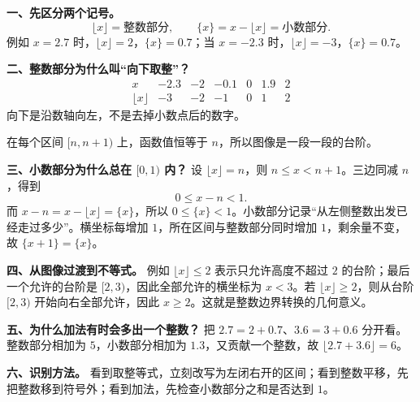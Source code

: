 \begin{explanationbox}
\textbf{一、先区分两个记号。}
\[\lfloor x\rfloor=\text{整数部分},\qquad \{x\}=x-\lfloor x\rfloor=\text{小数部分}.\]
例如 $x=2.7$ 时，$\lfloor x\rfloor=2$，$\{x\}=0.7$；当 $x=-2.3$ 时，$\lfloor x\rfloor=-3$，$\{x\}=0.7$。

\textbf{二、整数部分为什么叫“向下取整”？}
\[\begin{array}{c|rrrrrr}x&-2.3&-2&-0.1&0&1.9&2\\\hline \lfloor x\rfloor&-3&-2&-1&0&1&2\end{array}\]
向下是沿数轴向左，不是去掉小数点后的数字。

在每个区间 $[n,n+1)$ 上，函数值恒等于 $n$，所以图像是一段一段的台阶。

\textbf{三、小数部分为什么总在 $[0,1)$ 内？}
设 $\lfloor x\rfloor=n$，则 $n\le x<n+1$。三边同减 $n$，得到
\[0\le x-n<1.\]
而 $x-n=x-\lfloor x\rfloor=\{x\}$，所以 $0\le\{x\}<1$。小数部分记录“从左侧整数出发已经走过多少”。横坐标每增加 $1$，所在区间与整数部分同时增加 $1$，剩余量不变，故 $\{x+1\}=\{x\}$。

\textbf{四、从图像过渡到不等式。} 例如 $\lfloor x\rfloor\le2$ 表示只允许高度不超过 $2$ 的台阶；最后一个允许的台阶是 $[2,3)$，因此全部允许的横坐标为 $x<3$。若 $\lfloor x\rfloor\ge2$，则从台阶 $[2,3)$ 开始向右全部允许，因此 $x\ge2$。这就是整数边界转换的几何意义。

\textbf{五、为什么加法有时会多出一个整数？} 把 $2.7=2+0.7$、$3.6=3+0.6$ 分开看。整数部分相加为 $5$，小数部分相加为 $1.3$，又贡献一个整数，故 $\lfloor2.7+3.6\rfloor=6$。


\textbf{六、识别方法。} 看到取整等式，立刻改写为左闭右开的区间；看到整数平移，先把整数移到符号外；看到加法，先检查小数部分之和是否达到 $1$。
\end{explanationbox}
